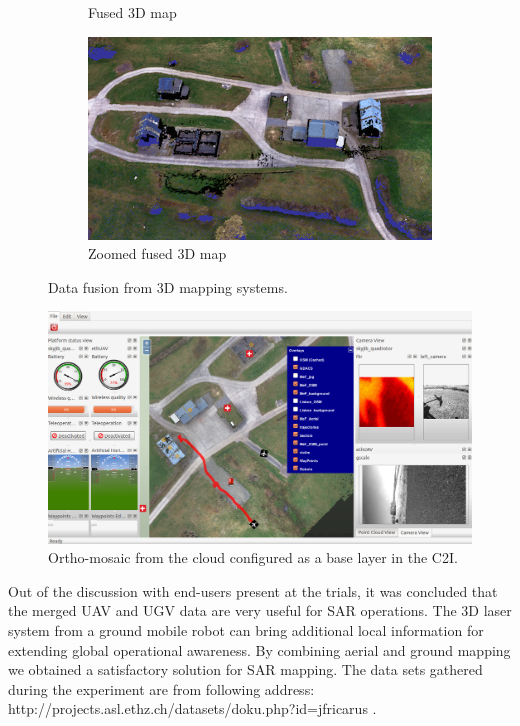 \documentclass{article}
\begin{document}
\begin{figure} [h]
\begin{subfigure} [b]{0.45\textwidth}
         \caption{Fused 3D map}
         \label{fig:MeFuav+ugv}
    \end{subfigure}%
    \begin{subfigure} [b]{0.45\textwidth}
         \centering
         \includegraphics[scale=0.55]{ROB-15-0035_fig34d.png}
         \caption{Zoomed fused 3D map}
         \label{fig:MeFuav+ugvZoom1}
    \end{subfigure}%
    \caption{Data fusion from 3D mapping systems.}
    \label{fig:datafusion}
\end{figure}

\begin{figure}
 \centering
    \includegraphics[scale=0.4]{ROB-15-0035_fig35.png}
    \caption{Ortho-mosaic from the cloud configured as a base layer in the C2I.}
    \label{fig:c2i_ortho_UAVs}
\end{figure}
Out of the discussion with end-users present at the trials, it was concluded that the merged UAV and UGV data are very useful for SAR operations.
The 3D laser system from a ground mobile robot can bring additional local information for extending global operational awareness.
By combining aerial and ground mapping we obtained a satisfactory solution for SAR mapping. The data sets gathered during the experiment are from following address: http://projects.asl.ethz.ch/datasets/doku.php?id=jfricarus .
\end{document}
